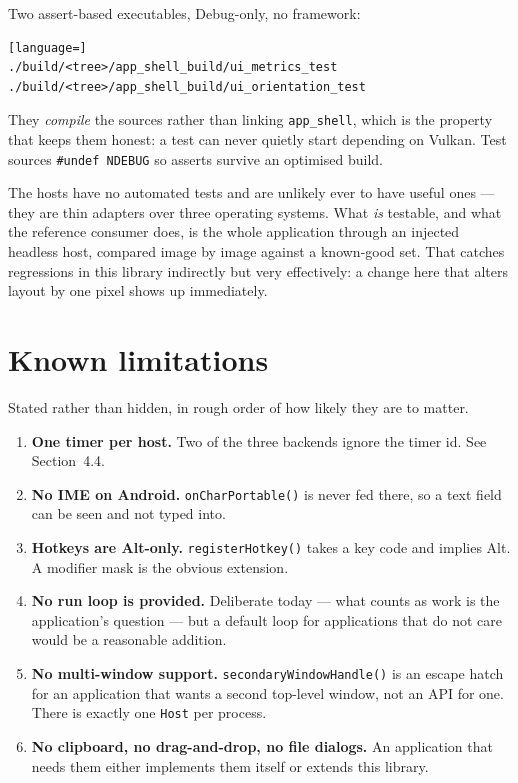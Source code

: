 \documentclass[11pt,a4paper]{article}
\begin{document}
Two assert-based executables, Debug-only, no framework:

\begin{lstlisting}[language=]
./build/<tree>/app_shell_build/ui_metrics_test
./build/<tree>/app_shell_build/ui_orientation_test
\end{lstlisting}

They \emph{compile} the sources rather than linking \texttt{app\_shell}, which
is the property that keeps them honest: a test can never quietly start depending
on Vulkan. Test sources \texttt{\#undef NDEBUG} so asserts survive an optimised
build.

The hosts have no automated tests and are unlikely ever to have useful ones ---
they are thin adapters over three operating systems. What \emph{is} testable, and
what the reference consumer does, is the whole application through an injected
headless host, compared image by image against a known-good set. That catches
regressions in this library indirectly but very effectively: a change here that
alters layout by one pixel shows up immediately.

\section{Known limitations}

Stated rather than hidden, in rough order of how likely they are to matter.

\begin{enumerate}[leftmargin=*]
\item \textbf{One timer per host.} Two of the three backends ignore the timer
  id. See Section~4.4.
\item \textbf{No IME on Android.} \texttt{onCharPortable()} is never fed there,
  so a text field can be seen and not typed into.
\item \textbf{Hotkeys are Alt-only.} \texttt{registerHotkey()} takes a key code
  and implies Alt. A modifier mask is the obvious extension.
\item \textbf{No run loop is provided.} Deliberate today --- what counts as work
  is the application's question --- but a default loop for applications that do
  not care would be a reasonable addition.
\item \textbf{No multi-window support.} \texttt{secondaryWindowHandle()} is an
  escape hatch for an application that wants a second top-level window, not an
  API for one. There is exactly one \texttt{Host} per process.
\item \textbf{No clipboard, no drag-and-drop, no file dialogs.} An application
  that needs them either implements them itself or extends this library.
\end{enumerate}
\end{document}
